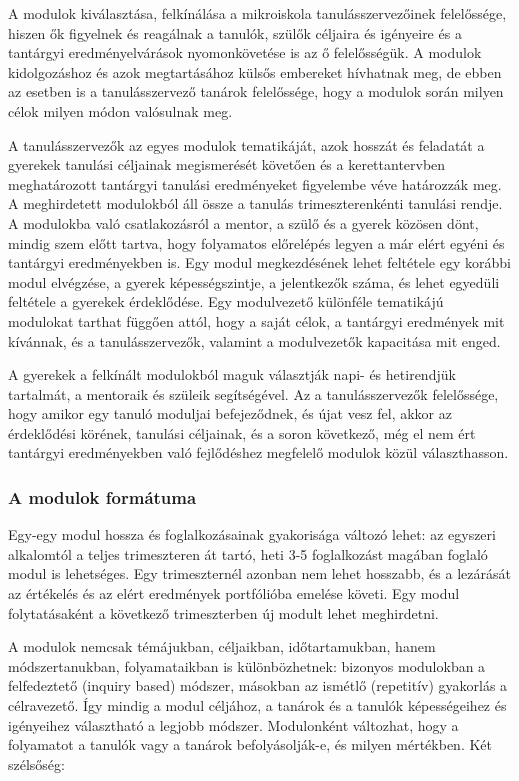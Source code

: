 A modulok kiválasztása, felkínálása a mikroiskola tanulásszervezőinek
felelőssége, hiszen ők figyelnek és reagálnak a tanulók, szülők céljaira
és igényeire és a tantárgyi eredményelvárások nyomonkövetése is az ő
felelősségük. A modulok kidolgozáshoz és azok megtartásához külsős
embereket hívhatnak meg, de ebben az esetben is a tanulásszervező
tanárok felelőssége, hogy a modulok során milyen célok milyen módon
valósulnak meg.

A tanulásszervezők az egyes modulok tematikáját, azok hosszát és
feladatát a gyerekek tanulási céljainak megismerését követően és a
kerettantervben meghatározott tantárgyi tanulási eredményeket figyelembe
véve határozzák meg. A meghirdetett modulokból áll össze a tanulás
trimeszterenkénti tanulási rendje. A modulokba való csatlakozásról a
mentor, a szülő és a gyerek közösen dönt, mindig szem előtt tartva, hogy
folyamatos előrelépés legyen a már elért egyéni és tantárgyi
eredményekben is. Egy modul megkezdésének lehet feltétele egy korábbi
modul elvégzése, a gyerek képességszintje, a jelentkezők száma, és lehet
egyedüli feltétele a gyerekek érdeklődése. Egy modulvezető különféle
tematikájú modulokat tarthat függően attól, hogy a saját célok, a
tantárgyi eredmények mit kívánnak, és a tanulásszervezők, valamint a
modulvezetők kapacitása mit enged.

A gyerekek a felkínált modulokból maguk választják napi-
és hetirendjük tartalmát, a mentoraik és szüleik segítségével. Az a
tanulásszervezők felelőssége, hogy amikor egy tanuló moduljai
befejeződnek, és újat vesz fel, akkor az érdeklődési körének, tanulási
céljainak, és a soron következő, még el nem ért tantárgyi eredményekben
való fejlődéshez megfelelő modulok közül választhasson.

\subsubsection{A modulok formátuma}

Egy-egy modul hossza és foglalkozásainak gyakorisága változó lehet: az
egyszeri alkalomtól a teljes trimeszteren át tartó, heti 3-5
foglalkozást magában foglaló modul is lehetséges. Egy trimeszternél
azonban nem lehet hosszabb, és a lezárását az értékelés és az elért
eredmények portfólióba emelése követi. Egy modul folytatásaként a
következő trimeszterben új modult lehet meghirdetni.

A modulok nemcsak témájukban, céljaikban, időtartamukban, hanem
módszertanukban, folyamataikban is különbözhetnek: bizonyos modulokban a
felfedeztető (inquiry based) módszer, másokban az ismétlő (repetitív)
gyakorlás a célravezető. Így mindig a modul céljához, a tanárok és a
tanulók képességeihez és igényeihez választható a legjobb módszer.
Modulonként változhat, hogy a folyamatot a tanulók vagy a tanárok
befolyásolják-e, és milyen mértékben. Két szélsőség:

